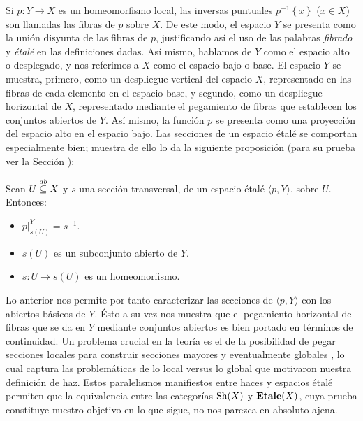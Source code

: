 Si $p:Y\to X$ es un homeomorfismo local, las inversas puntuales $p^{-1}\left\lbrace x\right\rbrace$ ($x\in X$) son llamadas las fibras de $p$ sobre $X$. De este modo, el espacio $Y$ se presenta como la unión disyunta de las fibras de $p$, justificando así el uso de las palabras \textit{fibrado} y \textit{étalé} en las definiciones dadas. Así mismo, hablamos de $Y$ como el espacio alto o desplegado, y nos referimos a $X$ como el espacio bajo o base. El espacio $Y$ se muestra, primero, como un despliegue vertical del espacio $X$, representado en las fibras de cada elemento en el espacio base, y segundo, como un despliegue horizontal de $X$, representado mediante el pegamiento de fibras que establecen los conjuntos abiertos de $Y$. Así mismo, la función $p$ se presenta como una proyección del espacio alto en el espacio bajo. Las secciones de un espacio étalé se comportan especialmente bien; muestra de ello lo da la siguiente proposición (para su prueba ver la Sección ):
\begin{Prop}
   Sean $U\stackrel{ab}{\subseteq} X$ y $s$ una sección transversal, de un espacio étalé $\langle p, Y\rangle$, sobre $U$. Entonces:
   \begin{itemize}
      \item $p|^{Y}_{s(U)}=s^{-1}$.
      \item $s(U)$ es un subconjunto abierto de $Y$.
      \item $s:U\to s(U)$ es un homeomorfismo.
   \end{itemize}
\end{Prop}
Lo anterior nos permite por tanto caracterizar las secciones de $\langle p, Y\rangle$ con los abiertos básicos de $Y$. Ésto a su vez nos muestra que el pegamiento horizontal de fibras que se da en $Y$ mediante conjuntos abiertos es bien portado en términos de continuidad. Un problema crucial en la teoría es el de la posibilidad de pegar secciones locales para construir secciones mayores y eventualmente globales \cite{MHPM}, lo cual captura las problemáticas de lo local versus lo global que motivaron nuestra definición de haz. Estos paralelismos manifiestos entre haces y espacios étalé permiten que la equivalencia entre las categorías $\normalfont{\text{Sh}} (X)$ y $\normalfont{\textbf{Etale}} (X)$, cuya prueba constituye nuestro objetivo en lo que sigue, no nos parezca en absoluto ajena.
